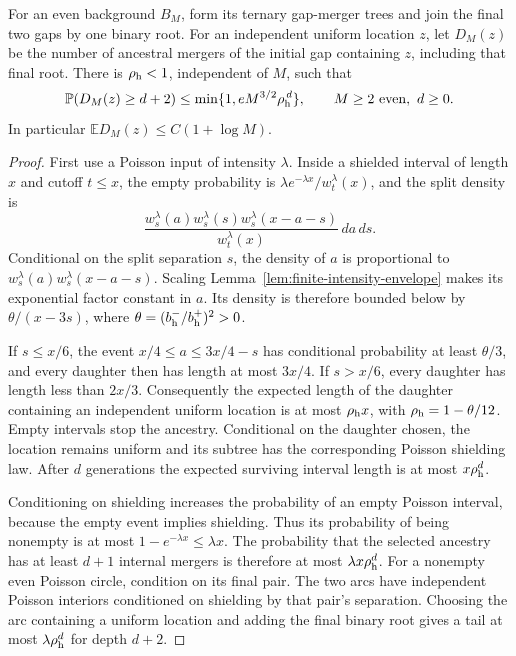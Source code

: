 \documentclass[11pt,letterpaper]{article}
\newcommand{\PP}{\mathbb P}\newcommand{\EE}{\mathbb E}
\begin{document}
\begin{lemma}
\label{lem:insertion-height}
For an even background $B_M$, form its ternary gap-merger trees and
join the final two gaps by one binary root. For an independent
uniform location $z$, let $D_M(z)$ be the number of ancestral mergers
of the initial gap containing $z$, including that final root.
There is $\rho_{\rm h}<1$, independent of $M$, such that
\begin{equation}\label{eq:height-tail}
 \PP(D_M(z)\ge d+2)
 \le\min\{1,eM^{3/2}\rho_{\rm h}^{\,d}\},
 \qquad M\ge2\text{ even},\ d\ge0.
\end{equation}
In particular $\EE D_M(z)\le C(1+\log M)$.
\end{lemma}
\begin{proof}
First use a Poisson input of intensity $\lambda$. Inside a shielded
interval of length $x$ and cutoff $t\le x$, the empty probability is
$\lambda e^{-\lambda x}/w_t^\lambda(x)$, and the split density is
\[
 \frac{w_s^\lambda(a)w_s^\lambda(s)
                         w_s^\lambda(x-a-s)}{w_t^\lambda(x)}\,da\,ds.
\]
Conditional on the split separation $s$, the density of $a$ is
proportional to $w_s^\lambda(a)w_s^\lambda(x-a-s)$.
Scaling Lemma~\ref{lem:finite-intensity-envelope} makes its exponential
factor constant in $a$. Its density is therefore bounded below by
$\theta/(x-3s)$, where $\theta=(b_{\rm h}^-/b_{\rm h}^+)^2>0$.

If $s\le x/6$, the event
$x/4\le a\le3x/4-s$ has conditional probability at least $\theta/3$,
and every daughter then has length at most $3x/4$.
If $s>x/6$, every daughter has length less than $2x/3$.
Consequently the expected length of the daughter containing an
independent uniform location is at most
$\rho_{\rm h}x$, with $\rho_{\rm h}=1-\theta/12$.
Empty intervals stop the ancestry. Conditional on the daughter chosen,
the location remains uniform and its subtree has the corresponding
Poisson shielding law. After $d$ generations the expected surviving
interval length is at most $x\rho_{\rm h}^d$.

Conditioning on shielding increases the probability of an empty
Poisson interval, because the empty event implies shielding.
Thus its probability of being nonempty is at most
$1-e^{-\lambda x}\le\lambda x$.
The probability that the selected ancestry has at least $d+1$
internal mergers is therefore at most $\lambda x\rho_{\rm h}^d$.
For a nonempty even Poisson circle, condition on its final pair.
The two arcs have independent Poisson interiors conditioned on
shielding by that pair's separation. Choosing the arc containing a
uniform location and adding the final binary root gives a tail at
most $\lambda\rho_{\rm h}^d$ for depth $d+2$.


\end{proof}
\end{document}
